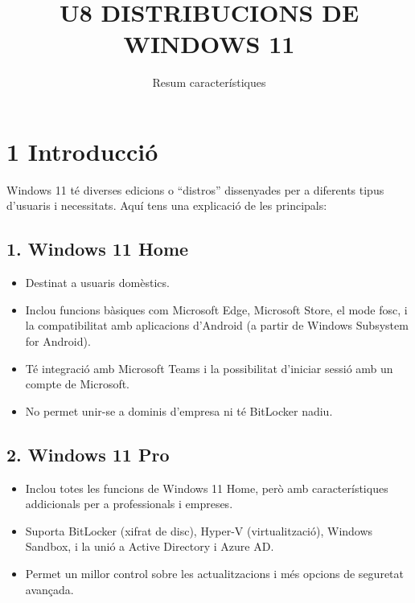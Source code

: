\documentclass[
  12 pt,
  a4paper,
]{article}
\title{U8 DISTRIBUCIONS DE WINDOWS 11}
\subtitle{Resum característiques}
\author{}
\date{\vspace{-2.5em}}
\providecommand{\tightlist}{%
  \setlength{\itemsep}{0pt}\setlength{\parskip}{0pt}}
\begin{document}
\maketitle

\newpage
\renewcommand\tablename{Tabla}

\section{1 Introducció}\label{introducciuxf3}

Windows 11 té diverses edicions o ``distros'' dissenyades per a
diferents tipus d'usuaris i necessitats. Aquí tens una explicació de les
principals:

\subsection{1. Windows 11 Home}\label{windows-11-home}

\begin{itemize}
\tightlist
\item
  Destinat a usuaris domèstics.
\item
  Inclou funcions bàsiques com Microsoft Edge, Microsoft Store, el mode
  fosc, i la compatibilitat amb aplicacions d'Android (a partir de
  Windows Subsystem for Android).
\item
  Té integració amb Microsoft Teams i la possibilitat d'iniciar sessió
  amb un compte de Microsoft.
\item
  No permet unir-se a dominis d'empresa ni té BitLocker nadiu.
\end{itemize}

\subsection{2. Windows 11 Pro}\label{windows-11-pro}

\begin{itemize}
\tightlist
\item
  Inclou totes les funcions de Windows 11 Home, però amb
  característiques addicionals per a professionals i empreses.
\item
  Suporta BitLocker (xifrat de disc), Hyper-V (virtualització), Windows
  Sandbox, i la unió a Active Directory i Azure AD.
\item
  Permet un millor control sobre les actualitzacions i més opcions de
  seguretat avançada.
\end{itemize}
\end{document}
